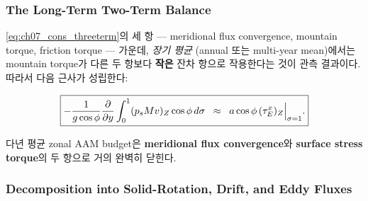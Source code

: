 
\subsubsection{The Long-Term Two-Term Balance}

\eqref{eq:ch07_cons_threeterm}의 세 항 — meridional flux convergence,
mountain torque, friction torque — 가운데, \textit{장기 평균} (annual 또는
multi-year mean)에서는 mountain torque가 다른 두 항보다 \textbf{작은} 잔차
항으로 작용한다는 것이 관측 결과이다.  따라서 다음 근사가 성립한다:

\begin{equation}\label{eq:ch07_trans_two_term}
  \boxed{
  -\frac{1}{g\cos\phi}\frac{\partial}{\partial y}
   \int_0^1 (p_s M v)_Z\cos\phi\,d\sigma
  \;\;\approx\;\;
   a\cos\phi\,(\tau_E^x)_Z\Bigl|_{\sigma=1}.
  }
\end{equation}

\begin{theorem}\label{thm:ch07_trans_two_term}
다년 평균 zonal AAM budget은 \textbf{meridional flux convergence}와
\textbf{surface stress torque}의 두 항으로 거의 완벽히 닫힌다.
\end{theorem}


\subsubsection{Decomposition into Solid-Rotation, Drift, and Eddy Fluxes}

